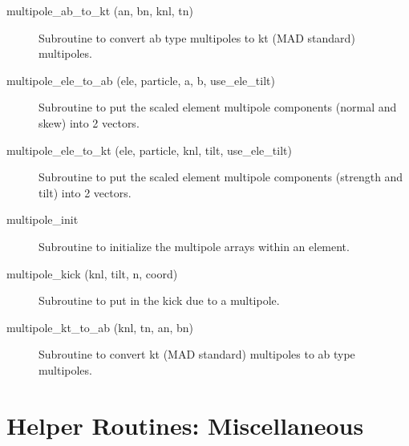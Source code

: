 \begin{description}

\item[multipole\_ab\_to\_kt (an, bn, knl, tn)] \Newline
Subroutine to convert ab type multipoles to kt (MAD standard) multipoles. 

\item[multipole\_ele\_to\_ab (ele, particle, a, b, use\_ele\_tilt)] \Newline
Subroutine to put the scaled element multipole components (normal and skew) into 2 vectors. 

\item[multipole\_ele\_to\_kt (ele, particle, knl, tilt, use\_ele\_tilt)] \Newline
Subroutine to put the scaled element multipole components (strength and tilt) into 2 vectors. 

\item[multipole\_init] \Newline
 Subroutine to initialize the multipole arrays within an element.

\item[multipole\_kick (knl, tilt, n, coord)] \Newline
Subroutine to put in the kick due to a multipole. 

\item[multipole\_kt\_to\_ab (knl, tn, an, bn)] \Newline
Subroutine to convert kt (MAD standard) multipoles to ab type multipoles. 

\end{description}

\section{Helper Routines: Miscellaneous}
\label{r:misc_help}

